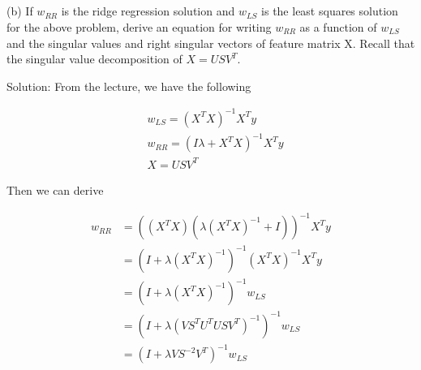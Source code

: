 \documentclass[11pt]{report}
\begin{document}
\pagebreak

\subsection {}
(b) If $w_{RR}$ is the ridge regression solution and $w_{LS}$ is the least squares solution for the above problem,
derive an equation for writing $w_{RR}$ as a function of $w_{LS}$ and the singular values and right singular vectors
of feature matrix X. Recall that the singular value decomposition of $X = USV^T$.

\begin{flushleft}
Solution: From the lecture, we have the following
\end{flushleft}
\begin{align*}
&w_{LS} = (X^T X)^{-1} X^T y \\
&w_{RR} = (I \lambda + X^T X)^{-1} X^T y \\
&X = USV^T
\end{align*}

\begin{flushleft}
Then we can derive
\end{flushleft}
\begin{equation*}
\begin{split}
w_{RR} &= ((X^TX) (\lambda (X^TX)^{-1} + I))^{-1} X^T y \\
&= (I + \lambda (X^TX)^{-1})^{-1} (X^TX)^{-1} X^T y \\
&= (I + \lambda (X^TX)^{-1})^{-1} w_{LS} \\
&= (I + \lambda (V S^T U^T U S V^T)^{-1})^{-1} w_{LS} \\
&= (I + \lambda V S^{-2} V^T)^{-1} w_{LS} \\
\end{split} 
\end{equation*}
\end{document}
